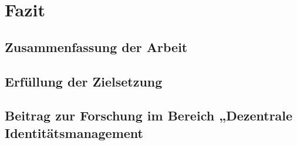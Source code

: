 \chapter{Fazit}
\label{cha:fazit}

\section{Zusammenfassung der Arbeit}
\blindtext

\section{Erfüllung der Zielsetzung}
\blindtext

\section{Beitrag zur Forschung im Bereich „Dezentrale Identitätsmanagement}
\blindtext